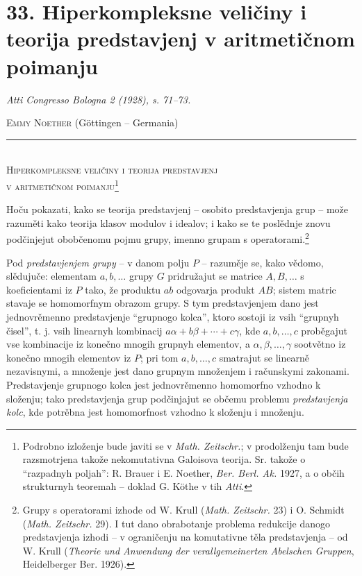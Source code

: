 \documentclass[11pt]{article}
\begin{document}
\section*{33. Hiperkompleksne veličiny i teorija predstavjenj v aritmetičnom poimanju}
\emph{Atti Congresso Bologna 2 (1928), s. 71--73.}

\begin{center}
\textsc{Emmy Noether} (Göttingen -- Germania)\\[-0.1em]
\rule{3em}{0.4pt}\\[0.8em]
\textsc{Hiperkompleksne veličiny i teorija predstavjenj}\\
\textsc{v aritmetičnom poimanju}\footnote{Podrobno izloženje bude javiti se v \emph{Math. Zeitschr.}; v prodolženju tam bude razsmotrjena takože nekomutativna Galoisova teorija. Sr. takože o “razpadnyh poljah”: R. Brauer i E. Noether, \emph{Ber. Berl. Ak.} 1927, a o občih strukturnyh teoremah -- doklad G. Köthe v tih \emph{Atti}.}
\end{center}

Hoču pokazati, kako se teorija predstavjenj -- osobito predstavjenja grup -- može razuměti kako teorija klasov modulov i idealov; i kako se te poslědnje znovu podčinjejut obobčenomu pojmu grupy, imenno grupam s operatorami.\footnote{Grupy s operatorami izhode od W. Krull (\emph{Math. Zeitschr.} 23) i O. Schmidt (\emph{Math. Zeitschr.} 29). I tut dano obrabotanje problema redukcije danogo predstavjenja izhodi -- v ograničenju na komutativne těla predstavjenja -- od W. Krull (\emph{Theorie und Anwendung der verallgemeinerten Abelschen Gruppen}, Heidelberger Ber. 1926).}

Pod \emph{predstavjenjem grupy} -- v danom polju $P$ -- razuměje se, kako vědomo, slědujuče: elementam $a,b,\ldots$ grupy $G$ pridružajut se matrice $A,B,\ldots$ s koeficientami iz $P$ tako, že produktu $ab$ odgovarja produkt $AB$; sistem matric stavaje se homomorfnym obrazom grupy. S tym predstavjenjem dano jest jednovrěmenno predstavjenje “grupnogo kolca”, ktoro sostoji iz vsih “grupnyh čisel”, t. j. vsih linearnyh kombinacij $a\alpha+b\beta+\cdots+c\gamma$, kde $a,b,\ldots,c$ proběgajut vse kombinacije iz konečno mnogih grupnyh elementov, a $\alpha,\beta,\ldots,\gamma$ sootvětno iz konečno mnogih elementov iz $P$; pri tom $a,b,\ldots,c$ smatrajut se linearně nezavisnymi, a množenje jest dano grupnym množenjem i računskymi zakonami. Predstavjenje grupnogo kolca jest jednovrěmenno homomorfno vzhodno k složenju; tako predstavjenja grup podčinjajut se občemu problemu \emph{predstavjenja kolc}, kde potrěbna jest homomorfnost vzhodno k složenju i množenju.
\end{document}
